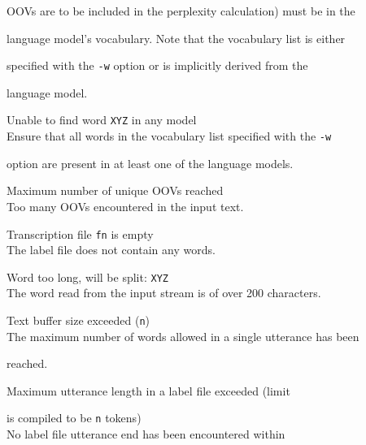 \begin{itemize}
\begin{itemize}
        OOVs are to be included in the perplexity calculation) must be in the


        language model's vocabulary. Note that the vocabulary list is either 


        specified with the {\tt -w} option or is implicitly derived from the 


        language model.





 Unable to find word {\tt XYZ} in any model\\


        Ensure that all words in the vocabulary list specified with the {\tt -w}


        option are present in at least one of the language models.





 Maximum number of unique OOVs reached\\


        Too many OOVs encountered in the input text.





 Transcription file {\tt fn} is empty\\


        The label file does not contain any words.





 Word too long, will be split: {\tt XYZ}\\


        The word read from the input stream is of over 200 characters.





 Text buffer size exceeded ({\tt n})\\ 


        The maximum number of words allowed in a single utterance has been 


        reached.





 Maximum utterance length in a label file exceeded (limit


        is compiled to be {\tt n} tokens)\\


        No label file utterance end has been encountered within



\end{itemize}
\end{itemize}
